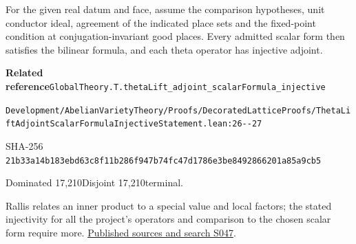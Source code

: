 \begin{formalstatement}[D415]\label{decomp:D415}
For the given real datum and face, assume the comparison hypotheses, unit conductor ideal, agreement of the indicated place sets and the fixed-point condition at conjugation-invariant good places. Every admitted scalar form then satisfies the bilinear formula, and each theta operator has injective adjoint.
\end{formalstatement}
{\small\raggedright\noindent\textsf{\bfseries Related reference}\quad \nolinkurl{GlobalTheory.T.thetaLift_adjoint_scalarFormula_injective}\par\noindent \nolinkurl{Development/AbelianVarietyTheory/Proofs/DecoratedLatticeProofs/ThetaLiftAdjointScalarFormulaInjectiveStatement.lean:26--27}\par\noindent SHA-256 \nolinkurl{21b33a14b183ebd63c8f11b286f947b74fc47d1786e3be8492866201a85a9cb5}\par\noindent Dominated 17,210\quad Disjoint 17,210\quad terminal.\par}
Rallis relates an inner product to a special value and local factors; the stated injectivity for all the project's operators and comparison to the chosen scalar form require more.
\hyperref[lit:S047]{Published sources and search S047}.
